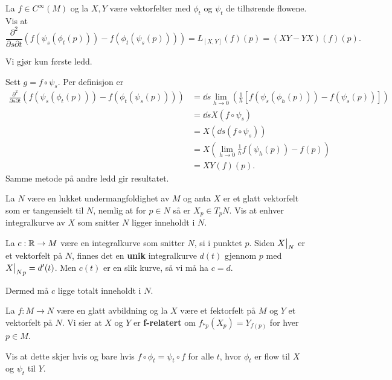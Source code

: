 \documentclass[11pt, english]{article}
\begin{document}
\begin{exc}
La $f \in C^\infty(M)$ og la $X,Y$ være vektorfelter med $\phi_t$ og $\psi_t$ de tilhørende flowene. Vis at
$$
\frac{\partial^2}{\partial s \partial t} \left( f(\psi_s(\phi_t(p)))-f(\phi_t(\psi_s(p))) \right) = L_{[X,Y]}(f) (p)=(XY-YX)(f)(p).
$$
\end{exc}
\begin{sol}
Vi gjør kun første ledd.

Sett $g=f \circ \psi_s$. Per definisjon er
\begin{align*}
\frac{\partial^2}{\partial s \partial t} \left( f(\psi_s(\phi_t(p)))-f(\phi_t(\psi_s(p))) \right)  &= \dd{}{s} \lim_{h \to 0} \left( \frac 1h \left[ f(\psi_s(\phi_{h}(p)))-f(\psi_s(p)) \right] \right) \\ 
&= \dd{}{s} X(f \circ \psi_s) \\
&= X( \dd{}{s}(f \circ \psi_s)) \\
&= X (\lim_{h \to 0} \frac 1h f(\psi_h(p))-f(p)) \\
&= XY(f)(p).
\end{align*}
Samme metode på andre ledd gir resultatet.
\end{sol}

\begin{oppg}
La $N$ være en lukket undermangfoldighet av $M$ og anta $X$ er et glatt vektorfelt som er tangensielt til $N$, nemlig at for $p \in N$ så er $X_p \in T_p N$. Vis at enhver integralkurve av $X$ som snitter $N$ ligger inneholdt i $N$.
\end{oppg}
\begin{losn}
La $c:\mathbb{R} \to M$ være en integralkurve som snitter $N$, si i punktet $p$. Siden $\restr{X}{N}$ er et vektorfelt på $N$, finnes det en \textbf{unik} integralkurve $d(t)$ gjennom $p$ med $\restr{X}{N}_p = d'(t)$. Men $c(t)$ er en slik kurve, så vi må ha $c=d$.

Dermed må $c$ ligge totalt inneholdt i $N$.
\end{losn}


\begin{oppg}
La $f: M \to N$ være en glatt avbildning og la $X$ være et fektorfelt på $M$ og $Y$ et vektorfelt på $N$. Vi sier at $X$ og $Y$ er \textbf{f-relatert} om $f_{\ast p}(X_p) = Y_{f(p)}$ for hver $p \in M$. 

Vis at dette skjer hvis og bare hvis $f \circ \phi_t = \psi_t \circ f$ for alle $t$, hvor $\phi_t$ er flow til $X$ og $\psi_t$ til $Y$.
\end{oppg}
\begin{losn}

\end{losn}
\end{document}
